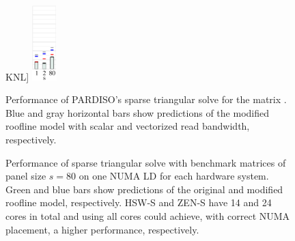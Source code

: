 \begin{figure}[t]
KNL]{%
\includegraphics[height=2.9cm,clip=true]{images/perf/ps-n-20000/p-single-core-knightmare1-n-20000}
\label{fig:p:single-core:knl}
} %
  \caption{Performance of PARDISO's sparse triangular solve
    for the matrix . %
    Blue and gray horizontal bars show predictions of the modified roofline model 
    with scalar and vectorized read bandwidth, respectively.
    }%
  \label{fig:p:single-core}%
\end{figure}

\begin{figure}%
  \centering%
  \caption{Performance of sparse triangular solve with benchmark matrices of
panel size $s=80$ on one NUMA LD for each hardware system.
  Green and blue bars show predictions of the original and modified roofline
model, respectively.
  HSW-S and ZEN-S have 14 and 24 cores in total and using all cores could
achieve, with correct NUMA placement, a higher performance, respectively.}
  \label{fig:p:pardiso}
\end{figure}


